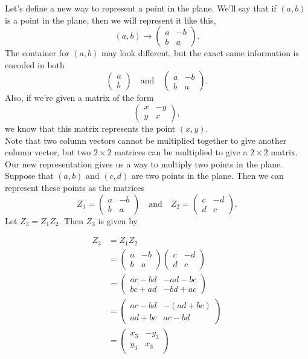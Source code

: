 \documentclass{article}
\begin{document}
Let's define a new way to represent a point in the plane. We'll say that if $\left(a, b\right)$ is a point in the plane, then we will represent it like this, $$\left(a, b\right) \rightarrow \begin{pmatrix}a & -b\\b & a\end{pmatrix}.$$ The container for $\left(a, b\right)$ may look different, but the exact same information is encoded in both $$\begin{pmatrix}a\\b\end{pmatrix} \quad \text{and} \quad \begin{pmatrix}a & -b\\b & a\end{pmatrix}.$$ Also, if we're given a matrix of the form $$\begin{pmatrix}x & -y\\y & x\end{pmatrix},$$ we know that this matrix represents the point $\left(x, y\right).$\\

Note that two column vectors cannot be multiplied together to give another column vector, but two $2 \times 2$ matrices can be multiplied to give a $2 \times 2$ matrix. Our new representation gives us a way to multiply two points in the plane. Suppose that $\left(a, b\right)$ and $\left(c, d\right)$ are two points in the plane. Then we can represent these points as the matrices $$ Z_1 = \begin{pmatrix}a & -b\\b & a\end{pmatrix} \quad \text{and} \quad Z_2 = \begin{pmatrix}c & -d\\d & c\end{pmatrix}.$$ Let $Z_3 = Z_1Z_2.$ Then $Z_3$ is given by

\begin{align*}
Z_3 &= Z_1 Z_2\\
&= \begin{pmatrix}a & -b\\b & a\end{pmatrix} \begin{pmatrix}c & -d\\d & c\end{pmatrix}\\
&= \begin{pmatrix}ac - bd & -ad - bc\\bc + ad & -bd + ac\end{pmatrix}\\
&= \begin{pmatrix}ac - bd & -(ad + bc)\\ad + bc & ac - bd\end{pmatrix}\\
&= \begin{pmatrix}x_3 & -y_3\\y_3 & x_3\end{pmatrix}\\
\end{align*}
\end{document}
